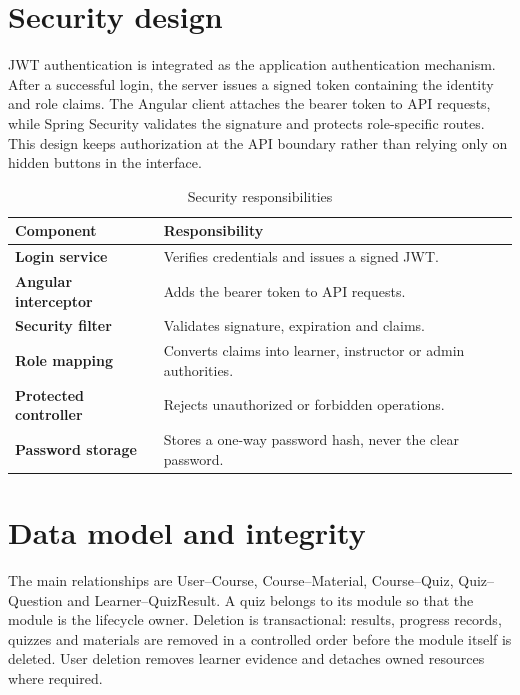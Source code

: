 \section{Security design}
JWT authentication is integrated as the application authentication mechanism.
After a successful login, the server issues a signed token containing the
identity and role claims. The Angular client attaches the bearer token to API
requests, while Spring Security validates the signature and protects
role-specific routes. This design keeps authorization at the API boundary
rather than relying only on hidden buttons in the interface.


\begin{table}[H]\centering
\caption{Security responsibilities}\label{tab:security}
\begin{tabularx}{\textwidth}{>{\bfseries}p{}X}
\toprule Component & Responsibility\\\midrule
Login service & Verifies credentials and issues a signed JWT.\\
Angular interceptor & Adds the bearer token to API requests.\\
Security filter & Validates signature, expiration and claims.\\
Role mapping & Converts claims into learner, instructor or admin authorities.\\
Protected controller & Rejects unauthorized or forbidden operations.\\
Password storage & Stores a one-way password hash, never the clear password.\\
\bottomrule
\end{tabularx}
\end{table}

\section{Data model and integrity}
The main relationships are User--Course, Course--Material, Course--Quiz,
Quiz--Question and Learner--QuizResult. A quiz belongs to its module so that
the module is the lifecycle owner. Deletion is transactional: results,
progress records, quizzes and materials are removed in a controlled order
before the module itself is deleted. User deletion removes learner evidence
and detaches owned resources where required.

